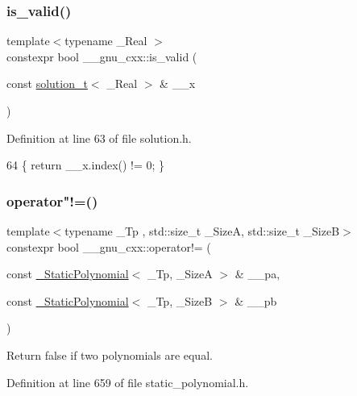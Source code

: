\subsubsection{\texorpdfstring{is\+\_\+valid()}{is\_valid()}}
{\footnotesize\ttfamily template$<$typename \+\_\+\+Real $>$ \\
constexpr bool \+\_\+\+\_\+gnu\+\_\+cxx\+::is\+\_\+valid (\begin{DoxyParamCaption}\item[{const \hyperlink{namespace____gnu__cxx_ae20ea642de50eb361074c62676b0159c}{solution\+\_\+t}$<$ \+\_\+\+Real $>$ \&}]{\+\_\+\+\_\+x }\end{DoxyParamCaption})}



Definition at line 63 of file solution.\+h.


\begin{DoxyCode}
64     \{ \textcolor{keywordflow}{return} \_\_x.index() != 0; \}
\end{DoxyCode}
\mbox{\label{namespace____gnu__cxx_af19ad85b9b29562d2e134f3db6b3a651}} 
\subsubsection{\texorpdfstring{operator"!=()}{operator!=()}\hspace{0.1cm}{\footnotesize\ttfamily [1/3]}}
{\footnotesize\ttfamily template$<$typename \+\_\+\+Tp , std\+::size\+\_\+t \+\_\+\+SizeA, std\+::size\+\_\+t \+\_\+\+SizeB$>$ \\
constexpr bool \+\_\+\+\_\+gnu\+\_\+cxx\+::operator!= (\begin{DoxyParamCaption}\item[{const \hyperlink{class____gnu__cxx_1_1__StaticPolynomial}{\+\_\+\+Static\+Polynomial}$<$ \+\_\+\+Tp, \+\_\+\+SizeA $>$ \&}]{\+\_\+\+\_\+pa,  }\item[{const \hyperlink{class____gnu__cxx_1_1__StaticPolynomial}{\+\_\+\+Static\+Polynomial}$<$ \+\_\+\+Tp, \+\_\+\+SizeB $>$ \&}]{\+\_\+\+\_\+pb }\end{DoxyParamCaption})\hspace{0.3cm}{\ttfamily [inline]}}

Return false if two polynomials are equal. 

Definition at line 659 of file static\+\_\+polynomial.\+h.


